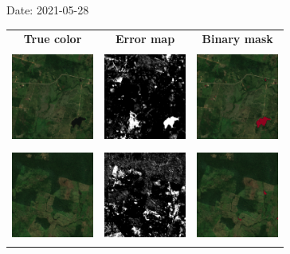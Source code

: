 \documentclass{beamer}
\begin{document}
\begin{frame}{Date: 2021-05-28}
    \begin{tabular}{ccc}
        \textbf{True color} & \textbf{Error map} & \textbf{Binary mask}\\
        \includegraphics[width=2.7cm,height=3cm]{Figures/v6/20210528/TCI_zoom5.png}& \includegraphics[width=2.7cm,height=3cm]{Figures/v6/20210528/error_map_zoom5.png} &\includegraphics[width=2.7cm,height=3cm]{Figures/v6/20210528/zoom5_BI.png}\\
        \includegraphics[width=2.7cm,height=3cm]{Figures/v6/20210528/TCI_zoom6.png}& \includegraphics[width=2.7cm,height=3cm]{Figures/v6/20210528/error_map_zoom6.png} &\includegraphics[width=2.7cm,height=3cm]{Figures/v6/20210528/zoom6_BI.png}\\
        \end{tabular}
\end{frame}
\end{document}
